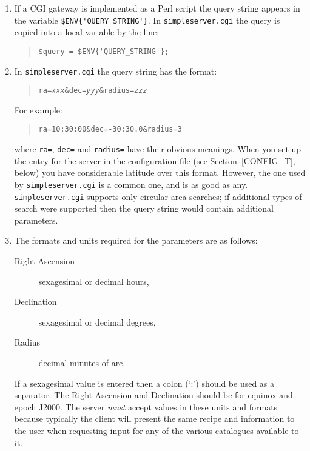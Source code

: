 \documentclass[twoside,11pt,nolof,chapters]{starlink}
\begin{document}
\begin{enumerate}

  \item If a CGI gateway is implemented as a Perl script the query
   string appears in the variable \verb-$ENV{'QUERY_STRING'}-.
   In \texttt{simpleserver.cgi} the query is copied into a local variable
   by the line:

  \begin{quote}
   \verb-$query = $ENV{'QUERY_STRING'};-
  \end{quote}

  \item In \texttt{simpleserver.cgi} the query string has the format:

  \begin{quote}
   \texttt{ra=\textit{xxx}\&dec=\textit{yyy}\&radius=\textit{zzz}}
  \end{quote}

   For example:

  \begin{quote}
   \texttt{ra=10:30:00\&dec=-30:30.0\&radius=3}
  \end{quote}

   where \texttt{ra=}, \texttt{dec=} and \texttt{radius=} have their obvious
   meanings.  When you set up the entry for the server in the configuration
   file (see Section~\ref{CONFIG_T}, below) you have considerable latitude
   over this format.  However, the one used by \texttt{simpleserver.cgi} is a
   common one, and is as good as any.  \texttt{simpleserver.cgi} supports
   only circular area searches; if additional types of search were
   supported then the query string would contain additional parameters.

  \item The formats and units required for the parameters are as follows:

  \begin{description}

    \item[Right Ascension] sexagesimal or decimal hours,

    \item[Declination] sexagesimal or decimal degrees,

    \item[Radius] decimal minutes of arc.

  \end{description}

   If a sexagesimal value is entered then a colon (`:') should be used
   as a separator.  The Right Ascension and Declination should be for
   equinox and epoch J2000.  The server \textit{must}\/ accept values in
   these units and formats because typically the client will present
   the same recipe and information to the user when requesting input
   for any of the various catalogues available to it.

\end{enumerate}
\end{document}
